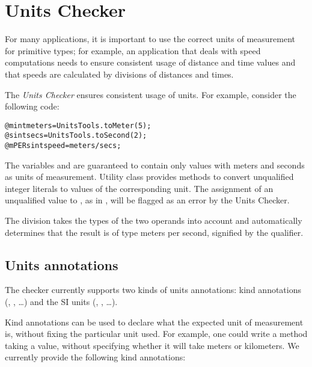 \htmlhr
\chapter{Units Checker\label{units-checker}}

For many applications, it is important to use the correct units of
measurement for primitive types; for example, an application that
deals with speed computations needs to ensure consistent usage of
distance and time values and that speeds are calculated by divisions
of distances and times.

The \emph{Units Checker} ensures consistent usage of units.
For example, consider the following code:

\begin{alltt}
@m int meters = UnitsTools.toMeter(5);
@s int secs = UnitsTools.toSecond(2);
@mPERs int speed = meters / secs;
\end{alltt}

The variables  and  are guaranteed to contain
only values with meters and seconds as units of measurement.
Utility class  provides methods to convert
unqualified integer literals to values of the corresponding unit.
The assignment of an unqualified value to , as in
, will be flagged as an error by the Units Checker.

The division  takes the types of the two operands
into account and automatically determines that the result is of type
meters per second, signified by the  qualifier.



\section{Units annotations\label{units-annotations}}

The checker currently supports two kinds of units annotations:
kind annotations (, , \dots) and
the SI units (, , \dots).


Kind annotations can be used to declare what the expected unit of
measurement is, without fixing the particular unit used.
For example, one could write a method taking a  value,
without specifying whether it will take meters or kilometers.
We currently provide the following kind annotations:

